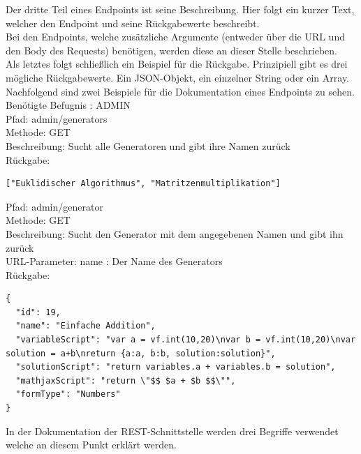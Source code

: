 Der dritte Teil eines Endpoints ist seine Beschreibung. Hier folgt ein kurzer Text, welcher den Endpoint und seine Rückgabewerte beschreibt. \\

Bei den Endpoints, welche zusätzliche Argumente (entweder über die URL und den Body des Requests) benötigen, werden diese an dieser Stelle beschrieben. \\

Als letztes folgt schließlich ein Beispiel für die Rückgabe. Prinzipiell gibt es drei mögliche Rückgabewerte. Ein JSON-Objekt, ein einzelner String oder ein Array. \\

Nachfolgend sind zwei Beispiele für die Dokumentation eines Endpoints zu sehen. \\

Benötigte Befugnis : ADMIN \\

\noindent Pfad: admin/generators \\
Methode: GET \\
Beschreibung: Sucht alle Generatoren und gibt ihre Namen zurück \\
Rückgabe: \begin{lstlisting} 
["Euklidischer Algorithmus", "Matritzenmultiplikation"]
\end{lstlisting}

\noindent Pfad: admin/generator \\
Methode: GET \\
Beschreibung: Sucht den Generator mit dem angegebenen Namen und gibt ihn zurück \\
URL-Parameter: name : Der Name des Generators \\
Rückgabe: \begin{lstlisting} 
{
  "id": 19,
  "name": "Einfache Addition",
  "variableScript": "var a = vf.int(10,20)\nvar b = vf.int(10,20)\nvar solution = a+b\nreturn {a:a, b:b, solution:solution}",
  "solutionScript": "return variables.a + variables.b = solution",
  "mathjaxScript": "return \"$$ $a + $b $$\"",
  "formType": "Numbers"
}
\end{lstlisting}

In der Dokumentation der REST-Schnittstelle werden drei Begriffe verwendet welche an diesem Punkt erklärt werden. \\

